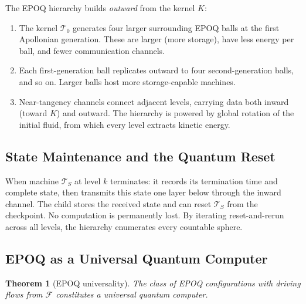 \documentclass[11pt]{article}
\theoremstyle{plain}
\newtheorem{theorem}{Theorem}
\theoremstyle{definition}
\theoremstyle{remark}
\begin{document}
The EPOQ hierarchy builds \emph{outward} from the kernel $K$:

\begin{enumerate}
  \item The kernel $\mathcal{T}_0$ generates four larger surrounding EPOQ
  balls at the first Apollonian generation. These are larger (more storage),
  have less energy per ball, and fewer communication channels.

  \item Each first-generation ball replicates outward to four
  second-generation balls, and so on. Larger balls host more
  storage-capable machines.

  \item Near-tangency channels connect adjacent levels, carrying data both
  inward (toward $K$) and outward. The hierarchy is powered by global
  rotation of the initial fluid, from which every level extracts kinetic
  energy.
\end{enumerate}

\subsection{State Maintenance and the Quantum Reset}

When machine $\mathcal{T}_S$ at level $k$ terminates:
it records its termination time and complete state, then transmits this
state one layer below through the inward channel. The child stores the
received state and can reset $\mathcal{T}_S$ from the checkpoint.
No computation is permanently lost. By iterating reset-and-rerun across
all levels, the hierarchy enumerates every countable sphere.

\subsection{EPOQ as a Universal Quantum Computer}

\begin{theorem}[EPOQ universality]
\label{thm:epoq_quantum}
The class of EPOQ configurations with driving flows from $\mathcal{F}$
constitutes a universal quantum computer.
\end{theorem}
\end{document}
